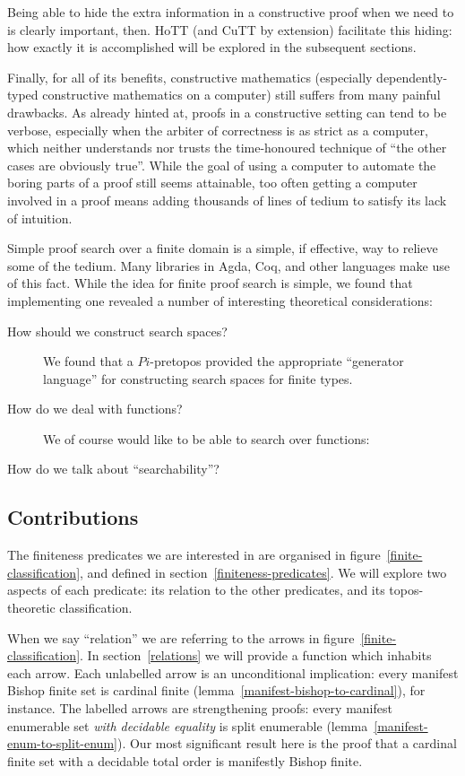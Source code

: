 Being able to hide the extra information in a constructive proof when we need to
is clearly important, then.
HoTT (and CuTT by extension) facilitate this hiding: how exactly it is
accomplished will be explored in the subsequent sections.

Finally, for all of its benefits, constructive mathematics (especially
dependently-typed constructive mathematics on a computer) still suffers from
many painful drawbacks.
As already hinted at, proofs in a constructive setting can tend to be verbose,
especially when the arbiter of correctness is as strict as a computer, which
neither understands nor trusts the time-honoured technique of ``the other cases
are obviously true''.
While the goal of using a computer to automate the boring parts of a proof still
seems attainable, too often getting a computer involved in a proof means adding
thousands of lines of tedium to satisfy its lack of intuition.

Simple proof search over a finite domain is a simple, if effective, way to
relieve some of the tedium.
Many libraries in Agda, Coq, and other languages make use of this fact.
While the idea for finite proof search is simple, we found that implementing one
revealed a number of interesting theoretical considerations:
\begin{description}
  \item[How should we construct search spaces?]
    We found that a \(Pi\)-pretopos provided the appropriate ``generator
    language'' for constructing search spaces for finite types.
  \item[How do we deal with functions?]
    We of course would like to be able to search over functions: 
  \item[How do we talk about ``searchability''?]
\end{description}
\subsection{Contributions}
The finiteness predicates we are interested in are organised in
figure~\ref{finite-classification}, and defined in
section~\ref{finiteness-predicates}.
We will explore two aspects of each predicate: its relation to the other
predicates, and its topos-theoretic classification.



When we say ``relation'' we are referring to the arrows in
figure~\ref{finite-classification}.
In section~\ref{relations} we will provide a function which inhabits each arrow.
Each unlabelled arrow is an unconditional implication: every manifest Bishop
finite set is cardinal finite (lemma~\ref{manifest-bishop-to-cardinal}), for
instance.
The labelled arrows are strengthening proofs: every manifest enumerable set
\emph{with decidable equality} is split enumerable
(lemma~\ref{manifest-enum-to-split-enum}).
Our most significant result here is the proof that a cardinal finite set with a
decidable total order is manifestly Bishop finite.

